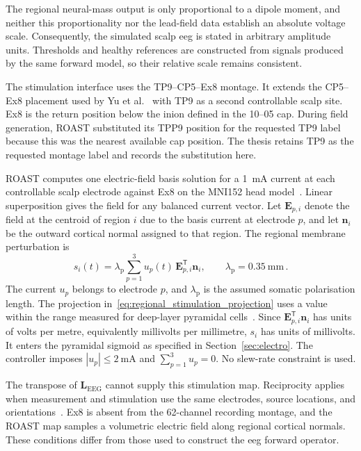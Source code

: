 The regional neural-mass output is only proportional to a dipole moment, and neither this
proportionality nor the lead-field data establish an absolute voltage scale. Consequently,
the simulated scalp \ac{eeg} is stated in arbitrary amplitude units. Thresholds and healthy
references are constructed from signals produced by the same forward model, so their
relative scale remains consistent.

The stimulation interface uses the TP9--CP5--Ex8 montage. It extends the CP5--Ex8
placement used by Yu et al.~\cite{Yu2024} with TP9 as a second controllable scalp site.
Ex8 is the return position below the inion defined in the 10--05 cap. During field
generation, ROAST substituted its TPP9 position for the requested TP9 label because this
was the nearest available cap position. The thesis retains TP9 as the requested montage
label and records the substitution here.

ROAST computes one electric-field basis solution for a \SI{1}{\milli\ampere} current at
each controllable scalp electrode against Ex8 on the MNI152 head model~\cite{Huang2019}.
Linear superposition gives the field for any balanced current vector. Let
$\mathbf{E}_{p,i}$ denote the field at the centroid of region $i$ due to the basis current
at electrode $p$, and let $\mathbf{n}_i$ be the outward cortical normal assigned to that
region. The regional membrane perturbation is
%
\begin{equation}
    s_i(t)
    = \lambda_\mathrm{p}\sum_{p=1}^{3}u_p(t)\,
      \mathbf{E}_{p,i}^{\mathsf{T}}\mathbf{n}_i,
    \qquad
    \lambda_\mathrm{p}=\SI{0.35}{\milli\metre} \, .
    \label{eq:regional_stimulation_projection}
\end{equation}
%
The current $u_p$ belongs to electrode $p$, and $\lambda_\mathrm{p}$ is the assumed somatic
polarisation length. The projection in~\eqref{eq:regional_stimulation_projection} uses a
value within the range measured for deep-layer
pyramidal cells~\cite{Radman2009}. Since
$\mathbf{E}_{p,i}^{\mathsf{T}}\mathbf{n}_i$ has units of volts per metre, equivalently
millivolts per millimetre, $s_i$ has units of millivolts. It enters the pyramidal sigmoid as
specified in Section~\ref{sec:electro}. The controller imposes
$|u_p|\leq\SI{2}{\milli\ampere}$ and $\sum_{p=1}^{3}u_p=0$. No slew-rate constraint is used.

The transpose of $\mathbf{L}_\mathrm{EEG}$ cannot supply this stimulation map. Reciprocity
applies when measurement and stimulation use the same electrodes, source locations, and
orientations~\cite{Malmivuo1995}. Ex8 is absent from the 62-channel recording montage, and
the ROAST map samples a volumetric electric field along regional cortical normals. These
conditions differ from those used to construct the \ac{eeg} forward operator.

